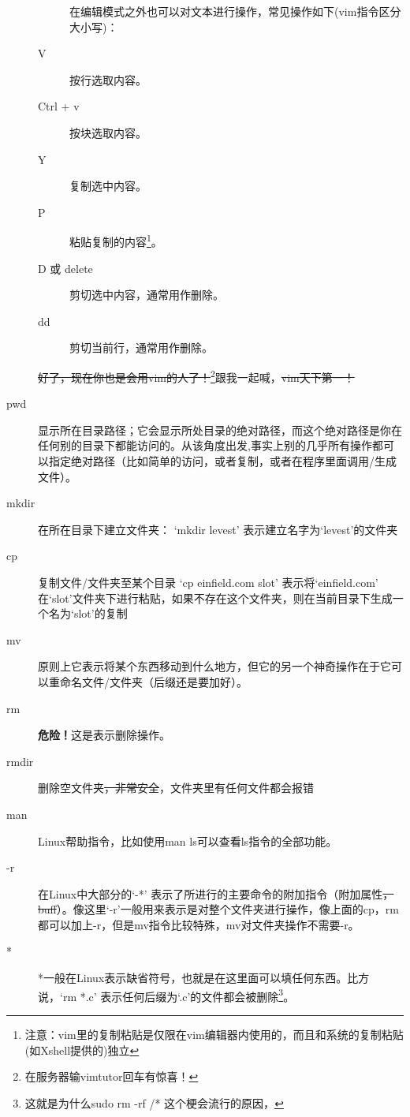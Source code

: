 \documentclass[12pt,a4paper,openany,twoside]{book}
\numberwithin{equation}{section}
\begin{document}
\begin{description}
\begin{description}
              在编辑模式之外也可以对文本进行操作，常见操作如下(vim指令区分大小写)：
              \item[V] 按行选取内容。
              \item[Ctrl + v] 按块选取内容。
              \item[Y] 复制选中内容。
              \item[P] 粘贴复制的内容\footnote{注意：vim里的复制粘贴是仅限在vim编辑器内使用的，而且和系统的复制粘贴(如Xshell提供的)独立}。
              \item[D 或 delete] 剪切选中内容，通常用作删除。
              \item[dd] 剪切当前行，通常用作删除。
            \end{description}
            \sout{好了，现在你也是会用vim的人了！}\footnote{在服务器输vimtutor回车有惊喜！}跟我一起喊，\sout{vim天下第一！}
          \item[pwd]
            显示所在目录路径；它会显示所处目录的绝对路径，而这个绝对路径是你在任何别的目录下都能访问的。从该角度出发,事实上别的几乎所有操作都可以指定绝对路径（比如简单的访问，或者复制，或者在程序里面调用/生成文件）。

          \item[mkdir]
            在所在目录下建立文件夹：
            ‘mkdir levest’ 表示建立名字为‘levest’的文件夹

          \item[cp] 复制文件/文件夹至某个目录
            ‘cp einfield.com slot’ 表示将‘einfield.com’ 在‘slot’文件夹下进行粘贴，如果不存在这个文件夹，则在当前目录下生成一个名为‘slot’的复制

          \item[mv] 原则上它表示将某个东西移动到什么地方，但它的另一个神奇操作在于它可以重命名文件/文件夹（后缀还是要加好）。

          \item[rm] \textbf{ 危险！}这是表示删除操作。
          
          \item[rmdir] 删除空文件夹\sout{，非常安全}，文件夹里有任何文件都会报错
          
          \item[man] Linux帮助指令，比如使用man ls可以查看ls指令的全部功能。

          \item[-r] 在Linux中大部分的‘-*’ 表示了所进行的主要命令的附加指令（附加属性\sout{，buff}）。像这里‘-r’一般用来表示是对整个文件夹进行操作，像上面的cp，rm 都可以加上-r，但是mv指令比较特殊，mv对文件夹操作不需要-r。

          \item[*] *一般在Linux表示缺省符号，也就是在这里面可以填任何东西。比方说，‘rm *.c’ 表示任何后缀为‘.c’的文件都会被删除\footnote{这就是为什么sudo rm -rf /* 这个梗会流行的原因，{}}。

        \end{description}
\end{document}
